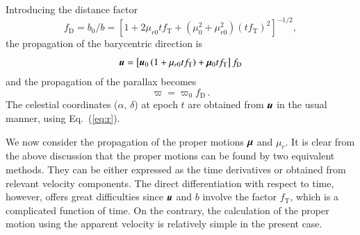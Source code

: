 \documentclass{aa}
\def\vec#1{\ensuremath{\mathchoice{\mbox{\boldmath$\displaystyle#1$}}
{\mbox{\boldmath$\textstyle#1$}}
{\mbox{\boldmath$\scriptstyle#1$}}
{\mbox{\boldmath$\scriptscriptstyle#1$}}}}
\begin{document}
Introducing the distance factor
\begin{equation}\label{eq:fd}
 f_\mathrm{D}=b_0/b=
\left[1+2\mu_{r0}tf_\mathrm{T}+
 \left(\mu_0^2+\mu_{r0}^2\right)\left(tf_\mathrm{T}\right)^2\right]^{-1/2},
\end{equation}
the propagation of the barycentric direction is
\begin{equation}\label{eq:prop_u}
 \vec{u}=
 \left[\vec{u}_0\left(1+\mu_{r0}tf_\mathrm{T}\right)+
       \vec{\mu}_0tf_\mathrm{T}\right]f_\mathrm{D}
\end{equation}
and the propagation of the parallax becomes
\begin{equation}\label{eq:prop_par}
    \varpi=\varpi_0f_\mathrm{D}\,.
\end{equation}
The celestial coordinates ($\alpha$, $\delta$) at epoch $t$ are obtained from $\vec{u}$ in the usual manner, using Eq.~(\ref{eq:r}).

We now consider the propagation of the proper motions $\vec{\mu}$ and $\mu_r$. It is clear from the above discussion that the proper motions can be found by two equivalent methods. They can be either expressed as the time derivatives or obtained from relevant velocity components. The direct differentiation with respect to time, however, offers great difficulties since $\vec{u}$ and $b$ involve the factor $f_\mathrm{T}$, which
is a complicated function of time. On the contrary, the calculation of the proper motion using the apparent
velocity is relatively simple in the present case.
\end{document}

